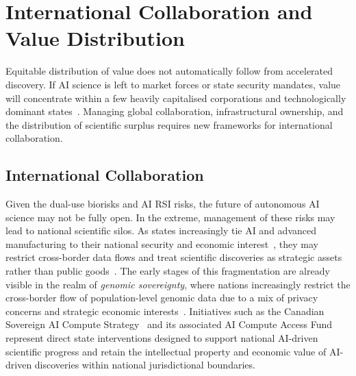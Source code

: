 \documentclass[11pt, a4paper, twocolumn, goog]{google}
\begin{document}
\section{International Collaboration and Value Distribution}
\label{sec:geopolitics}

Equitable distribution of value does not automatically follow from accelerated discovery. If AI science is left to market forces or state security mandates, value will concentrate within a few heavily capitalised corporations and technologically dominant states~\citep{bremmer2023ai}. Managing global collaboration, infrastructural ownership, and the distribution of scientific surplus requires new frameworks for international collaboration.

\subsection{International Collaboration}

Given the dual-use biorisks and AI RSI risks, the future of autonomous AI science may not be fully open. In the extreme, management of these risks may lead to national scientific silos. As states increasingly tie AI and advanced manufacturing to their national security and economic interest~\citep{lee2018ai}, they may restrict cross-border data flows and treat scientific discoveries as strategic assets rather than public goods~\citep{horowitz2018artificial}. The early stages of this fragmentation are already visible in the realm of \emph{genomic sovereignty}, where nations increasingly restrict the cross-border flow of population-level genomic data due to a mix of privacy concerns and strategic economic interests~\citep{majumder2016beyond, mckibbin2023genomic}. Initiatives such as the Canadian Sovereign AI Compute Strategy~\citep{ised_sovereign_ai_strategy_2026} and its associated AI Compute Access Fund~\citep{ised_ai_compute_fund_2026} represent direct state interventions designed to support national AI-driven scientific progress and retain the intellectual property and economic value of AI-driven discoveries within national jurisdictional boundaries.
\end{document}
